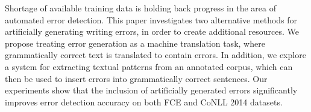 Shortage of available training data is holding back progress in the area of automated error detection. This paper investigates two alternative methods for artificially generating writing errors, in order to create additional resources. We propose treating error generation as a machine translation task, where grammatically correct text is translated to contain errors. In addition, we explore a system for extracting textual patterns from an annotated corpus, which can then be used to insert errors into grammatically correct sentences. Our experiments show that the inclusion of artificially generated errors significantly improves error detection accuracy on both FCE and CoNLL 2014 datasets.
